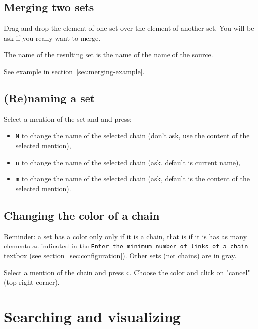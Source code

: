 \documentclass[12pt]{article}
\begin{document}
 \subsection{Merging two sets}

Drag-and-drop the element of one set over the element of another set.  You
will be ask if you really want to merge.

The name of the resulting set is the name of the name of the source.

See example in section~\ref{sec:merging-example}.

 \subsection{(Re)naming a set}

Select a mention of the set and and press:
\begin{itemize}
   \item \verb|N| to change the name of the selected chain (don't ask,
   use the content of the selected mention),
   \item \verb|n| to change the name of the selected chain (ask,
   default is current name),
   \item \verb|m| to change the name of the selected chain (ask,
   default is the content of the selected mention).
\end{itemize}

 \subsection{Changing the color of a chain}

Reminder: a set has a color only only if it is a chain, that is if it is has
as many elements as indicated in the
\verb|Enter the minimum number of links of a chain| textbox (see
section~\ref{sec:configuration}).  Other sets (not chains) are in gray.

Select a mention of the chain and press \verb|c|.  Choose the color and click
on "cancel" (top-right corner).


 \section{Searching and visualizing}
\end{document}
